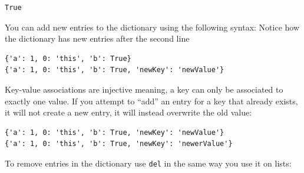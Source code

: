 \begin{Shaded}
\begin{Highlighting}[]
 
\end{Highlighting}
\end{Shaded}

\begin{verbatim}
True
\end{verbatim}

You can add new entries to the dictionary using the following syntax:
Notice how the dictionary has new entries after the second line

\begin{Shaded}
\begin{Highlighting}[]
\NormalTok{d[}\NormalTok{]}\OperatorTok{=}
\end{Highlighting}
\end{Shaded}

\begin{verbatim}
{'a': 1, 0: 'this', 'b': True}
{'a': 1, 0: 'this', 'b': True, 'newKey': 'newValue'}
\end{verbatim}

Key-value associations are injective meaning, a key can only be
associated to exactly one value. If you attempt to ``add'' an entry for
a key that already exists, it will not create a new entry, it will
instead overwrite the old value:

\begin{Shaded}
\begin{Highlighting}[]
\NormalTok{d[}\NormalTok{]}\OperatorTok{=}
\end{Highlighting}
\end{Shaded}

\begin{verbatim}
{'a': 1, 0: 'this', 'b': True, 'newKey': 'newValue'}
{'a': 1, 0: 'this', 'b': True, 'newKey': 'newerValue'}
\end{verbatim}

To remove entries in the dictionary use \texttt{del} in the same way you
use it on lists:

\begin{Shaded}
\begin{Highlighting}[]
\NormalTok{ d[}\NormalTok{]}
\end{Highlighting}
\end{Shaded}

